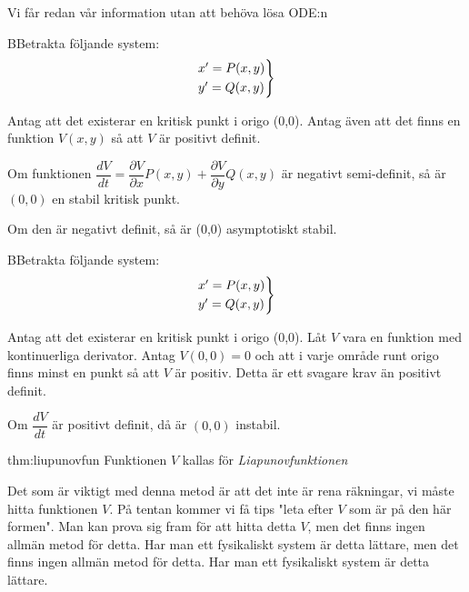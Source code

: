 \par\bigskip
\noindent Vi får redan vår information utan att behöva lösa ODE:n
\par\bigskip
\begin{theo}
  BBetrakta följande system:
  \begin{equation*}
    \begin{gathered}
      \begin{rcases*}
        x^{\prime} = P(x,y)\\
        y^{\prime} = Q(x,y)
      \end{rcases*}
    \end{gathered}
  \end{equation*}\par
  \noindent Antag att det existerar en kritisk punkt i origo (0,0). Antag även att det finns en funktion $V(x,y)$ så att $V$ är positivt definit.\par\bigskip
  \noindent Om funktionen $\dfrac{dV}{dt} = \dfrac{\partial V}{\partial x}P(x,y)+\dfrac{\partial V}{\partial y}Q(x,y)$ är negativt semi-definit, så är $(0,0)$ en stabil kritisk punkt.\par\bigskip
  \noindent Om den är negativt definit, så är (0,0) asymptotiskt stabil.
\end{theo}
\par\bigskip

\begin{theo}
  BBetrakta följande system:
  \begin{equation*}
    \begin{gathered}
      \begin{rcases*}
        x^{\prime} = P(x,y)\\
        y^{\prime} = Q(x,y)
      \end{rcases*}
    \end{gathered}
  \end{equation*}\par
  \noindent Antag att det existerar en kritisk punkt i origo (0,0). Låt $V$ vara en funktion med kontinuerliga derivator. Antag $V(0,0)=0$ och att i varje område runt origo finns minst en punkt så att $V$ är positiv. Detta är ett svagare krav än positivt definit.
  \par\bigskip
  \noindent Om $\dfrac{dV}{dt}$ är positivt definit, då är $(0,0)$ instabil.
\end{theo}
\par\bigskip
\begin{theo}{thm:liupunovfun}
  Funktionen $V$ kallas för \textit{Liapunovfunktionen}
\end{theo}
\par\bigskip
\noindent Det som är viktigt med denna metod är att det inte är rena räkningar, vi måste hitta funktionen $V$. På tentan kommer vi få tips "leta efter $V$ som är på den här formen". Man kan prova sig fram för att hitta detta $V$, men det finns ingen allmän metod för detta. Har man ett fysikaliskt system är detta lättare, men det finns ingen allmän metod för detta. Har man ett fysikaliskt system är detta lättare.

